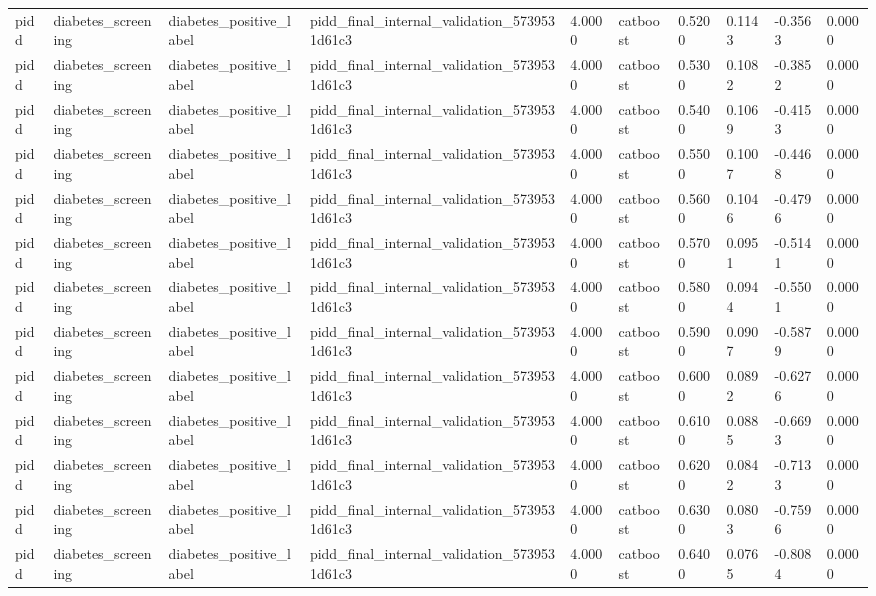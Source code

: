 \begin{tabular}{llllllllll}
pidd & diabetes\_screening & diabetes\_positive\_label & pidd\_final\_internal\_validation\_5739531d61c3 & 4.0000 & catboost & 0.5200 & 0.1143 & -0.3563 & 0.0000 \\
pidd & diabetes\_screening & diabetes\_positive\_label & pidd\_final\_internal\_validation\_5739531d61c3 & 4.0000 & catboost & 0.5300 & 0.1082 & -0.3852 & 0.0000 \\
pidd & diabetes\_screening & diabetes\_positive\_label & pidd\_final\_internal\_validation\_5739531d61c3 & 4.0000 & catboost & 0.5400 & 0.1069 & -0.4153 & 0.0000 \\
pidd & diabetes\_screening & diabetes\_positive\_label & pidd\_final\_internal\_validation\_5739531d61c3 & 4.0000 & catboost & 0.5500 & 0.1007 & -0.4468 & 0.0000 \\
pidd & diabetes\_screening & diabetes\_positive\_label & pidd\_final\_internal\_validation\_5739531d61c3 & 4.0000 & catboost & 0.5600 & 0.1046 & -0.4796 & 0.0000 \\
pidd & diabetes\_screening & diabetes\_positive\_label & pidd\_final\_internal\_validation\_5739531d61c3 & 4.0000 & catboost & 0.5700 & 0.0951 & -0.5141 & 0.0000 \\
pidd & diabetes\_screening & diabetes\_positive\_label & pidd\_final\_internal\_validation\_5739531d61c3 & 4.0000 & catboost & 0.5800 & 0.0944 & -0.5501 & 0.0000 \\
pidd & diabetes\_screening & diabetes\_positive\_label & pidd\_final\_internal\_validation\_5739531d61c3 & 4.0000 & catboost & 0.5900 & 0.0907 & -0.5879 & 0.0000 \\
pidd & diabetes\_screening & diabetes\_positive\_label & pidd\_final\_internal\_validation\_5739531d61c3 & 4.0000 & catboost & 0.6000 & 0.0892 & -0.6276 & 0.0000 \\
pidd & diabetes\_screening & diabetes\_positive\_label & pidd\_final\_internal\_validation\_5739531d61c3 & 4.0000 & catboost & 0.6100 & 0.0885 & -0.6693 & 0.0000 \\
pidd & diabetes\_screening & diabetes\_positive\_label & pidd\_final\_internal\_validation\_5739531d61c3 & 4.0000 & catboost & 0.6200 & 0.0842 & -0.7133 & 0.0000 \\
pidd & diabetes\_screening & diabetes\_positive\_label & pidd\_final\_internal\_validation\_5739531d61c3 & 4.0000 & catboost & 0.6300 & 0.0803 & -0.7596 & 0.0000 \\
pidd & diabetes\_screening & diabetes\_positive\_label & pidd\_final\_internal\_validation\_5739531d61c3 & 4.0000 & catboost & 0.6400 & 0.0765 & -0.8084 & 0.0000 \\

\end{tabular}
